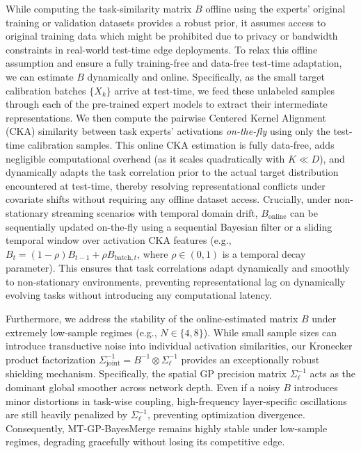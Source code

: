 \begin{remark}
While computing the task-similarity matrix $B$ offline using the experts'
original training or validation datasets provides a robust prior, it assumes
access to original training data which might be prohibited due to privacy or
bandwidth constraints in real-world test-time edge deployments. To relax this
offline assumption and ensure a fully training-free and data-free test-time
adaptation, we can estimate $B$ dynamically and online. Specifically, as the
small target calibration batches $\{X_k\}$ arrive at test-time, we feed these
unlabeled samples through each of the pre-trained expert models to extract their
intermediate representations. We then compute the pairwise Centered Kernel
Alignment (CKA) similarity between task experts' activations \emph{on-the-fly}
using only the test-time calibration samples. This online CKA estimation is
fully data-free, adds negligible computational overhead (as it scales
quadratically with $K \ll D$), and dynamically adapts the task correlation prior
to the actual target distribution encountered at test-time, thereby resolving
representational conflicts under covariate shifts without requiring any offline
dataset access. Crucially, under non-stationary streaming scenarios with temporal domain drift, $B_{\text{online}}$ can be sequentially updated on-the-fly using a sequential Bayesian filter or a sliding temporal window over activation CKA features (e.g., $B_{t} = (1 - \rho) B_{t-1} + \rho B_{\text{batch}, t}$, where $\rho \in (0, 1)$ is a temporal decay parameter). This ensures that task correlations adapt dynamically and smoothly to non-stationary environments, preventing representational lag on dynamically evolving tasks without introducing any computational latency.

Furthermore, we address the stability of the online-estimated matrix $B$ under
extremely low-sample regimes (e.g., $N \in \{4, 8\}$). While small sample sizes
can introduce transductive noise into individual activation similarities, our
Kronecker product factorization $\Sigma_{\text{joint}}^{-1} = B^{-1} \otimes
\Sigma_{\ell}^{-1}$ provides an exceptionally robust shielding mechanism.
Specifically, the spatial GP precision matrix $\Sigma_{\ell}^{-1}$ acts as the
dominant global smoother across network depth. Even if a noisy $B$ introduces
minor distortions in task-wise coupling, high-frequency layer-specific
oscillations are still heavily penalized by $\Sigma_{\ell}^{-1}$, preventing
optimization divergence. Consequently, MT-GP-BayesMerge remains highly stable
under low-sample regimes, degrading gracefully without losing its competitive
edge.


\end{remark}

